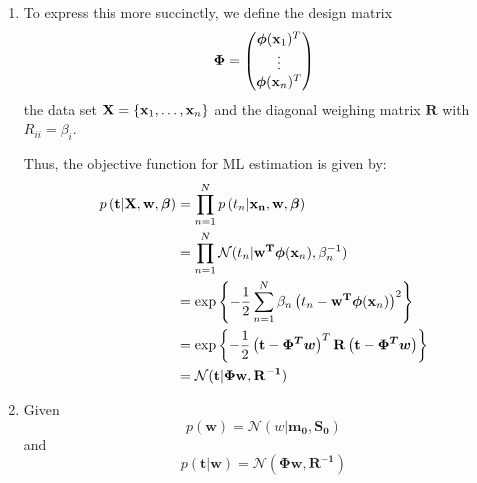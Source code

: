 \documentclass[reqno]{amsart}
\begin{document}
\begin{enumerate}[label=\textbf{(\Roman*)}]
        \solution
        \begin{enumerate}[label=\textbf{(\alph*)}]
            \item To express this more succinctly, we define the design matrix \[\boldsymbol{\Phi} = \begin{pmatrix}\boldsymbol{\phi}(\mathbf{x}_1)^T \\ \vdots \\ \boldsymbol{\phi}(\mathbf{x}_n)^T\end{pmatrix} \]
            the data set \(\mathbf{X} = \left\{\mathbf{x}_1, \ldots, \mathbf{x}_{n}\right\}\)
            and the diagonal weighing matrix \(\mathbf{R}\) with \(R_{ii} = \beta_i\).
            
            Thus, the objective function for ML estimation is given by:
            \begin{align}
                \begin{split}
                    p\left({\mathbf{t}} \middle| {\mathbf{X}, \mathbf{w}, \boldsymbol{\beta}}\right)  
                    &= \prod_{n = 1}^{N} p\left(t_n | \mathbf{x_n}, \mathbf{w}, \boldsymbol{\beta}\right) \\
                    &= \prod_{n = 1}^{N} \mathcal{N} (t_n | \mathbf{w^T} \boldsymbol{\phi}(\mathbf{x}_n), \beta_n^{-1}) \\
                    &= \exp \left\{- \frac{1}{2} \sum_{n = 1}^{N} \beta_n \left(t_n - \mathbf{w^T} \boldsymbol{\phi}(\mathbf{x}_n)\right)^2\right\} \\
                    &= \exp \left\{- \frac{1}{2} \left(\mathbf{t} - \boldsymbol{\Phi^T w}\right)^T \mathbf{R} \left(\mathbf{t} - \boldsymbol{\Phi^T w}\right)\right\} \\
                    &= \mathcal{N} (\mathbf{t}|\mathbf{\Phi w, R^{-1}}) \label{eq:ml} 
                \end{split}
            \end{align}
            \item 
                Given
                    \[p(\mathbf{w}) = \mathcal{N}(w|\mathbf{m_0, S_0})\]
                and
                    \[p(\mathbf{t|w}) = \mathcal{N}(\mathbf{\Phi w, R^{-1}})\]


\end{enumerate}
\end{enumerate}
\end{document}
